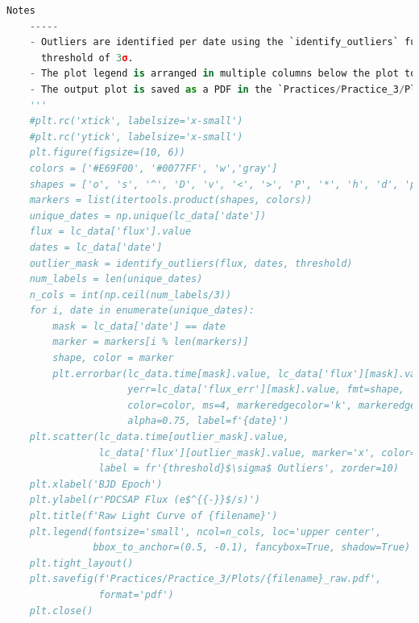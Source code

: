 \documentclass[a4paper,12pt]{article}
\newenvironment{solution}{}{}
\begin{document}
\begin{enumerate}
\begin{solution}
\begin{lstlisting}[language=python]
    Notes
    -----
    - Outliers are identified per date using the `identify_outliers` function with a default
      threshold of 3σ.
    - The plot legend is arranged in multiple columns below the plot to avoid overlapping data.
    - The output plot is saved as a PDF in the `Practices/Practice_3/Plots/` directory.
    '''
    #plt.rc('xtick', labelsize='x-small')
    #plt.rc('ytick', labelsize='x-small')
    plt.figure(figsize=(10, 6))
    colors = ['#E69F00', '#0077FF', 'w','gray']
    shapes = ['o', 's', '^', 'D', 'v', '<', '>', 'P', '*', 'h', 'd', 'p']
    markers = list(itertools.product(shapes, colors))
    unique_dates = np.unique(lc_data['date'])
    flux = lc_data['flux'].value
    dates = lc_data['date']
    outlier_mask = identify_outliers(flux, dates, threshold)
    num_labels = len(unique_dates)
    n_cols = int(np.ceil(num_labels/3))
    for i, date in enumerate(unique_dates):
        mask = lc_data['date'] == date
        marker = markers[i % len(markers)]
        shape, color = marker
        plt.errorbar(lc_data.time[mask].value, lc_data['flux'][mask].value,
                     yerr=lc_data['flux_err'][mask].value, fmt=shape,
                     color=color, ms=4, markeredgecolor='k', markeredgewidth=0.5,
                     alpha=0.75, label=f'{date}')
    plt.scatter(lc_data.time[outlier_mask].value,
                lc_data['flux'][outlier_mask].value, marker='x', color='k', s=25,
                label = fr'{threshold}$\sigma$ Outliers', zorder=10)
    plt.xlabel('BJD Epoch')
    plt.ylabel(r'PDCSAP Flux (e$^{{-}}$/s)')
    plt.title(f'Raw Light Curve of {filename}')
    plt.legend(fontsize='small', ncol=n_cols, loc='upper center',
               bbox_to_anchor=(0.5, -0.1), fancybox=True, shadow=True)
    plt.tight_layout()
    plt.savefig(f'Practices/Practice_3/Plots/{filename}_raw.pdf',
                format='pdf')
    plt.close()


\end{lstlisting}
\end{solution}
\end{enumerate}
\end{document}
